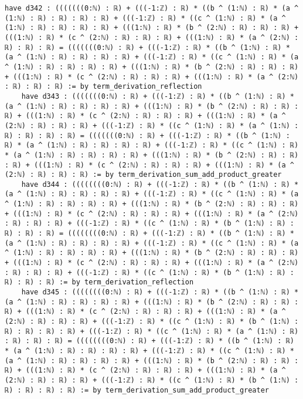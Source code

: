 \documentclass{article}
\begin{document}
\begin{tcolorbox}[colback=white!10, width=\linewidth]
\begin{lstlisting}[language=Lean4]
    have d342 : (((((((0:ℕ) : ℝ) + (((-1:ℤ) : ℝ) * ((b ^ (1:ℕ) : ℝ) * (a ^ (1:ℕ) : ℝ) : ℝ) : ℝ) : ℝ) + (((-1:ℤ) : ℝ) * ((c ^ (1:ℕ) : ℝ) * (a ^ (1:ℕ) : ℝ) : ℝ) : ℝ) : ℝ) + (((1:ℕ) : ℝ) * (b ^ (2:ℕ) : ℝ) : ℝ) : ℝ) + (((1:ℕ) : ℝ) * (c ^ (2:ℕ) : ℝ) : ℝ) : ℝ) + (((1:ℕ) : ℝ) * (a ^ (2:ℕ) : ℝ) : ℝ) : ℝ) = (((((((0:ℕ) : ℝ) + (((-1:ℤ) : ℝ) * ((b ^ (1:ℕ) : ℝ) * (a ^ (1:ℕ) : ℝ) : ℝ) : ℝ) : ℝ) + (((-1:ℤ) : ℝ) * ((c ^ (1:ℕ) : ℝ) * (a ^ (1:ℕ) : ℝ) : ℝ) : ℝ) : ℝ) + (((1:ℕ) : ℝ) * (b ^ (2:ℕ) : ℝ) : ℝ) : ℝ) + (((1:ℕ) : ℝ) * (c ^ (2:ℕ) : ℝ) : ℝ) : ℝ) + (((1:ℕ) : ℝ) * (a ^ (2:ℕ) : ℝ) : ℝ) : ℝ) := by term_derivation_reflection
    have d343 : (((((((0:ℕ) : ℝ) + (((-1:ℤ) : ℝ) * ((b ^ (1:ℕ) : ℝ) * (a ^ (1:ℕ) : ℝ) : ℝ) : ℝ) : ℝ) + (((1:ℕ) : ℝ) * (b ^ (2:ℕ) : ℝ) : ℝ) : ℝ) + (((1:ℕ) : ℝ) * (c ^ (2:ℕ) : ℝ) : ℝ) : ℝ) + (((1:ℕ) : ℝ) * (a ^ (2:ℕ) : ℝ) : ℝ) : ℝ) + (((-1:ℤ) : ℝ) * ((c ^ (1:ℕ) : ℝ) * (a ^ (1:ℕ) : ℝ) : ℝ) : ℝ) : ℝ) = (((((((0:ℕ) : ℝ) + (((-1:ℤ) : ℝ) * ((b ^ (1:ℕ) : ℝ) * (a ^ (1:ℕ) : ℝ) : ℝ) : ℝ) : ℝ) + (((-1:ℤ) : ℝ) * ((c ^ (1:ℕ) : ℝ) * (a ^ (1:ℕ) : ℝ) : ℝ) : ℝ) : ℝ) + (((1:ℕ) : ℝ) * (b ^ (2:ℕ) : ℝ) : ℝ) : ℝ) + (((1:ℕ) : ℝ) * (c ^ (2:ℕ) : ℝ) : ℝ) : ℝ) + (((1:ℕ) : ℝ) * (a ^ (2:ℕ) : ℝ) : ℝ) : ℝ) := by term_derivation_sum_add_product_greater
    have d344 : ((((((((0:ℕ) : ℝ) + (((-1:ℤ) : ℝ) * ((b ^ (1:ℕ) : ℝ) * (a ^ (1:ℕ) : ℝ) : ℝ) : ℝ) : ℝ) + (((-1:ℤ) : ℝ) * ((c ^ (1:ℕ) : ℝ) * (a ^ (1:ℕ) : ℝ) : ℝ) : ℝ) : ℝ) + (((1:ℕ) : ℝ) * (b ^ (2:ℕ) : ℝ) : ℝ) : ℝ) + (((1:ℕ) : ℝ) * (c ^ (2:ℕ) : ℝ) : ℝ) : ℝ) + (((1:ℕ) : ℝ) * (a ^ (2:ℕ) : ℝ) : ℝ) : ℝ) + (((-1:ℤ) : ℝ) * ((c ^ (1:ℕ) : ℝ) * (b ^ (1:ℕ) : ℝ) : ℝ) : ℝ) : ℝ) = ((((((((0:ℕ) : ℝ) + (((-1:ℤ) : ℝ) * ((b ^ (1:ℕ) : ℝ) * (a ^ (1:ℕ) : ℝ) : ℝ) : ℝ) : ℝ) + (((-1:ℤ) : ℝ) * ((c ^ (1:ℕ) : ℝ) * (a ^ (1:ℕ) : ℝ) : ℝ) : ℝ) : ℝ) + (((1:ℕ) : ℝ) * (b ^ (2:ℕ) : ℝ) : ℝ) : ℝ) + (((1:ℕ) : ℝ) * (c ^ (2:ℕ) : ℝ) : ℝ) : ℝ) + (((1:ℕ) : ℝ) * (a ^ (2:ℕ) : ℝ) : ℝ) : ℝ) + (((-1:ℤ) : ℝ) * ((c ^ (1:ℕ) : ℝ) * (b ^ (1:ℕ) : ℝ) : ℝ) : ℝ) : ℝ) := by term_derivation_reflection
    have d345 : ((((((((0:ℕ) : ℝ) + (((-1:ℤ) : ℝ) * ((b ^ (1:ℕ) : ℝ) * (a ^ (1:ℕ) : ℝ) : ℝ) : ℝ) : ℝ) + (((1:ℕ) : ℝ) * (b ^ (2:ℕ) : ℝ) : ℝ) : ℝ) + (((1:ℕ) : ℝ) * (c ^ (2:ℕ) : ℝ) : ℝ) : ℝ) + (((1:ℕ) : ℝ) * (a ^ (2:ℕ) : ℝ) : ℝ) : ℝ) + (((-1:ℤ) : ℝ) * ((c ^ (1:ℕ) : ℝ) * (b ^ (1:ℕ) : ℝ) : ℝ) : ℝ) : ℝ) + (((-1:ℤ) : ℝ) * ((c ^ (1:ℕ) : ℝ) * (a ^ (1:ℕ) : ℝ) : ℝ) : ℝ) : ℝ) = ((((((((0:ℕ) : ℝ) + (((-1:ℤ) : ℝ) * ((b ^ (1:ℕ) : ℝ) * (a ^ (1:ℕ) : ℝ) : ℝ) : ℝ) : ℝ) + (((-1:ℤ) : ℝ) * ((c ^ (1:ℕ) : ℝ) * (a ^ (1:ℕ) : ℝ) : ℝ) : ℝ) : ℝ) + (((1:ℕ) : ℝ) * (b ^ (2:ℕ) : ℝ) : ℝ) : ℝ) + (((1:ℕ) : ℝ) * (c ^ (2:ℕ) : ℝ) : ℝ) : ℝ) + (((1:ℕ) : ℝ) * (a ^ (2:ℕ) : ℝ) : ℝ) : ℝ) + (((-1:ℤ) : ℝ) * ((c ^ (1:ℕ) : ℝ) * (b ^ (1:ℕ) : ℝ) : ℝ) : ℝ) : ℝ) := by term_derivation_sum_add_product_greater

\end{lstlisting}
\end{tcolorbox}
\end{document}
